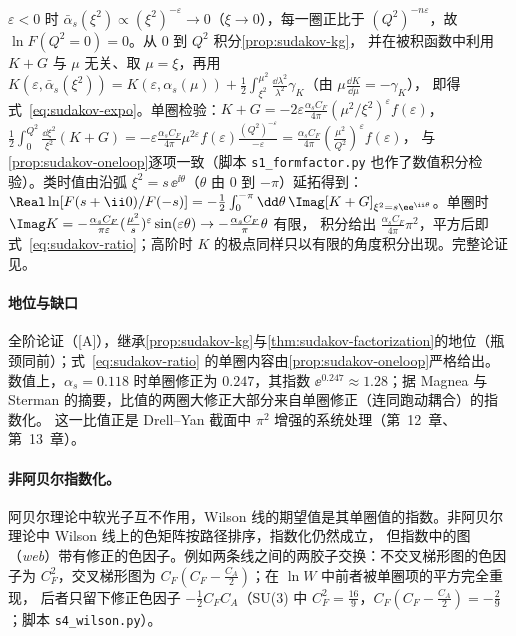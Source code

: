 \begin{proofsketch}
$\varepsilon<0$ 时 $\bar\alpha_s(\xi^2)\propto(\xi^2)^{-\varepsilon}\to0$（$\xi\to0$），每一圈正比于 $(Q^2)^{-n\varepsilon}$，故 $\ln F(Q^2=0)=0$。从 $0$ 到 $Q^2$ 积分\cref{prop:sudakov-kg}，
并在被积函数中利用 $K+G$ 与 $\mu$ 无关、取 $\mu=\xi$，再用 $K(\varepsilon,\bar\alpha_s(\xi^2))=K(\varepsilon,\alpha_s(\mu))+\frac12\int_{\xi^2}^{\mu^2}\frac{\dd\lambda^2}{\lambda^2}\gamma_K$（由 $\mu\frac{\dd K}{\dd\mu}=-\gamma_K$），
即得式~\eqref{eq:sudakov-expo}。单圈检验：$K+G=-2\varepsilon\frac{\alpha_sC_F}{4\pi}(\mu^2/\xi^2)^\varepsilon f(\varepsilon)$，
$\frac12\int_0^{Q^2}\frac{\dd\xi^2}{\xi^2}(K+G)=-\varepsilon\frac{\alpha_sC_F}{4\pi}\mu^{2\varepsilon}f(\varepsilon)\frac{(Q^2)^{-\varepsilon}}{-\varepsilon}=\frac{\alpha_sC_F}{4\pi}(\frac{\mu^2}{Q^2})^\varepsilon f(\varepsilon)$，
与\cref{prop:sudakov-oneloop}逐项一致（脚本 \texttt{s1\_formfactor.py} 也作了数值积分检验）。类时值由沿弧 $\xi^2=s\,\ee^{\ii\theta}$（$\theta$ 由 $0$ 到 $-\pi$）延拓得到：
$\Real\ln[F(s+\ii0)/F(-s)]=-\frac12\int_0^{-\pi}\dd\theta\,\Imag[K+G]_{\xi^2=s\ee^{\ii\theta}}$。单圈时 $\Imag K=-\frac{\alpha_sC_F}{\pi\varepsilon}(\frac{\mu^2}{s})^\varepsilon\sin(\varepsilon\theta)\to-\frac{\alpha_sC_F}\pi\theta$ 有限，
积分给出 $\frac{\alpha_sC_F}{4\pi}\pi^2$，平方后即式~\eqref{eq:sudakov-ratio}；高阶时 $K$ 的极点同样只以有限的角度积分出现。完整论证见\cite{Magnea:1990zb}。
\end{proofsketch}

\paragraph{地位与缺口}全阶论证（[A]），继承\cref{prop:sudakov-kg}与\cref{thm:sudakov-factorization}的地位（瓶颈同前）；式~\eqref{eq:sudakov-ratio} 的单圈内容由\cref{prop:sudakov-oneloop}严格给出。
数值上，$\alpha_s=0.118$ 时单圈修正为 $0.247$，其指数 $\ee^{0.247}\approx1.28$；据 Magnea 与 Sterman 的摘要，比值的两圈大修正大部分来自单圈修正（连同跑动耦合）的指数化\cite{Magnea:1990zb}。
这一比值正是 Drell--Yan 截面中 $\pi^2$ 增强的系统处理（第~12~章、第~13~章）。

\paragraph{非阿贝尔指数化。}阿贝尔理论中软光子互不作用，Wilson 线的期望值是其单圈值的指数。非阿贝尔理论中 Wilson 线上的色矩阵按路径排序，指数化仍然成立，
但指数中的图（\emph{web}）带有修正的色因子。例如两条线之间的两胶子交换：不交叉梯形图的色因子为 $C_F^2$，交叉梯形图为 $C_F(C_F-\frac{C_A}2)$；在 $\ln W$ 中前者被单圈项的平方完全重现，
后者只留下修正色因子 $-\frac12C_FC_A$（SU(3) 中 $C_F^2=\frac{16}9$，$C_F(C_F-\frac{C_A}2)=-\frac29$；脚本 \texttt{s4\_wilson.py}）。

